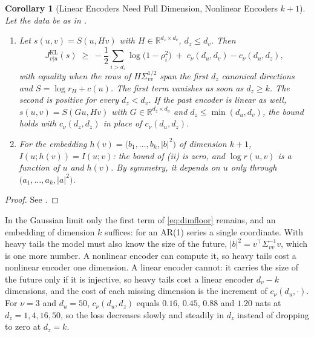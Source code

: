 \documentclass[11pt]{article}
\theoremstyle{plain}
\newtheorem{corollary}[theorem]{Corollary}
\theoremstyle{definition}
\theoremstyle{remark}
\newcommand{\RR}{\mathbb{R}}
\newcommand{\abs}[1]{\left\lvert #1 \right\rvert}
\newcommand{\Jvu}{J_{v\vert u}}
\begin{document}
\begin{corollary}[Linear Encoders Need Full Dimension, Nonlinear Encoders $k+1$]
 \label{cor:tdimension}
 Let the data be as in .
 \begin{enumerate}[label=(\roman*)]
  \item Let $s(u,v)=S(u,Hv)$ with $H\in\RR^{d_z\times d_v}$, $d_z\le d_v$.
        Then
        \begin{equation}
         \Jvu^{\mathrm{KL}}(s)\;\ge\;-\frac12\sum_{i>d_z}\log\bigl(1-\rho_i^{2}\bigr)
         \;+\;c_\nu(d_u,d_v)-c_\nu(d_u,d_z),
         \label{eq:dimfloor}
        \end{equation}
        with equality when the rows of $H\Sigma_{vv}^{1/2}$ span the first
        $d_z$ canonical directions and $S=\log r_H+c(u)$. The first term
        vanishes as soon as $d_z\ge k$. The second is positive for every
        $d_z<d_v$. If the past encoder is linear as well, $s(u,v)=S(Gu,Hv)$
        with $G\in\RR^{d_z\times d_u}$ and $d_z\le\min(d_u,d_v)$, the bound
        holds with $c_\nu(d_z,d_z)$ in place of $c_\nu(d_u,d_z)$.
  \item For the embedding $h(v)=\bigl(b_1,\dots,b_k,\abs{b}^{2}\bigr)$ of
        dimension $k+1$, $I(u;h(v))=I(u;v)$: the bound of
        (ii) is zero, and $\log r(u,v)$ is a function
        of $u$ and $h(v)$. By symmetry, it depends on $u$ only through
        $\bigl(a_1,\dots,a_k,\abs{a}^{2}\bigr)$.
 \end{enumerate}
\end{corollary}
\begin{proof}
 See .
\end{proof}

In the Gaussian limit only the first term of \eqref{eq:dimfloor} remains, and
an embedding of dimension $k$ suffices: for an AR(1) series a single
coordinate. With heavy tails the model must also know the size of the future,
$\abs{b}^{2}=v^{\top}\Sigma_{vv}^{-1}v$, which is one more number. A nonlinear
encoder can compute it, so heavy tails cost a nonlinear encoder one
dimension. A linear encoder cannot: it carries the size of the future only
if it is injective, so heavy tails cost a linear encoder $d_v-k$ dimensions,
and the cost of each missing dimension is the increment of $c_\nu(d_u,\cdot)$.
For $\nu=3$ and $d_u=50$, $c_\nu(d_u,d_z)$ equals $0.16$, $0.45$, $0.88$
and $1.20$ nats at $d_z=1,4,16,50$, so the loss decreases slowly and steadily
in $d_z$ instead of dropping to zero at $d_z=k$.
\end{document}
